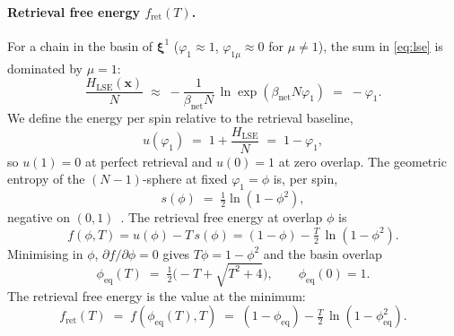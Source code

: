\documentclass[11pt]{article}
\newcommand{\bxi}{\boldsymbol{\xi}}
\newcommand{\bx}{\bm{x}}
\newcommand{\Bnet}{\beta_{\mathrm{net}}}
\newcommand{\phieq}{\phi_{\mathrm{eq}}}
\newcommand{\fret}{f_{\mathrm{ret}}}
\begin{document}
\paragraph{Retrieval free energy $\fret(T)$.}
For a chain in the basin of $\bxi^1$ ($\varphi_1 \approx 1$,
$\varphi_{1\mu} \approx 0$ for $\mu \neq 1$), the sum in
\eqref{eq:lse} is dominated by $\mu = 1$:
\begin{equation}
\frac{H_{\mathrm{LSE}}(\bx)}{N}
   \;\approx\; -\frac{1}{\Bnet N}\,\ln \exp(\Bnet N \varphi_1)
   \;=\; -\varphi_1.
\label{eq:Hret}
\end{equation}
We define the energy per spin relative to the retrieval baseline,
\begin{equation}
u(\varphi_1) \;=\; 1 + \frac{H_{\mathrm{LSE}}}{N} \;=\; 1 - \varphi_1,
\label{eq:u}
\end{equation}
so $u(1) = 0$ at perfect retrieval and $u(0) = 1$ at zero overlap.
The geometric entropy of the $(N-1)$-sphere at fixed
$\varphi_1 = \phi$ is, per spin,
\begin{equation}
s(\phi) \;=\; \tfrac12 \ln(1 - \phi^2),
\label{eq:s}
\end{equation}
negative on $(0, 1)$~\citep{icml2026theory}.  The retrieval free
energy at overlap $\phi$ is
\begin{equation}
f(\phi, T) = u(\phi) - T\,s(\phi)
          = (1 - \phi) - \tfrac{T}{2}\,\ln(1 - \phi^2).
\label{eq:f-phi}
\end{equation}
Minimising in $\phi$, $\partial f/\partial \phi = 0$ gives
$T \phi = 1 - \phi^2$ and the basin overlap
\begin{equation}
\phieq(T) \;=\; \tfrac12 \bigl(-T + \sqrt{T^2 + 4}\bigr),
\qquad \phieq(0) = 1.
\label{eq:phieq}
\end{equation}
The retrieval free energy is the value at the minimum:
\begin{equation}
\fret(T) \;=\; f(\phieq(T), T)
   \;=\; (1 - \phieq) - \tfrac{T}{2}\,\ln(1 - \phieq^2).
\label{eq:fret}
\end{equation}
\end{document}
